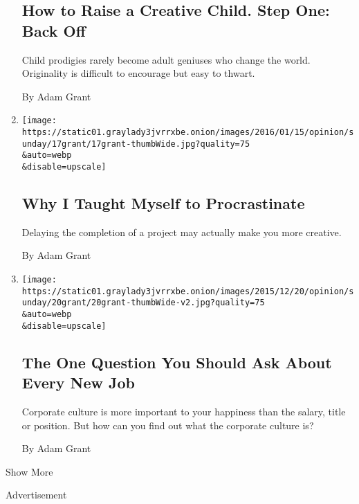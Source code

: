 \begin{enumerate}
  \hypertarget{how-to-raise-a-creative-child-step-one-back-off}{%
  \subsection{How to Raise a Creative Child. Step One: Back
  Off}\label{how-to-raise-a-creative-child-step-one-back-off}}

  Child prodigies rarely become adult geniuses who change the world.
  Originality is difficult to encourage but easy to thwart.

  By Adam Grant
\item
  \href{/2016/01/17/opinion/sunday/why-i-taught-myself-to-procrastinate.html}{}

  \texttt{[image: https://static01.graylady3jvrrxbe.onion/images/2016/01/15/opinion/sunday/17grant/17grant-thumbWide.jpg?quality=75\\\&auto=webp\\\&disable=upscale]}

  \hypertarget{why-i-taught-myself-to-procrastinate}{%
  \subsection{Why I Taught Myself to
  Procrastinate}\label{why-i-taught-myself-to-procrastinate}}

  Delaying the completion of a project may actually make you more
  creative.

  By Adam Grant
\item
  \href{/2015/12/20/opinion/sunday/the-one-question-you-should-ask-about-every-new-job.html}{}

  \texttt{[image: https://static01.graylady3jvrrxbe.onion/images/2015/12/20/opinion/sunday/20grant/20grant-thumbWide-v2.jpg?quality=75\\\&auto=webp\\\&disable=upscale]}

  \hypertarget{the-one-question-you-should-ask-about-every-new-job}{%
  \subsection{The One Question You Should Ask About Every New
  Job}\label{the-one-question-you-should-ask-about-every-new-job}}

  Corporate culture is more important to your happiness than the salary,
  title or position. But how can you find out what the corporate culture
  is?

  By Adam Grant
\end{enumerate}

Show More

Advertisement


